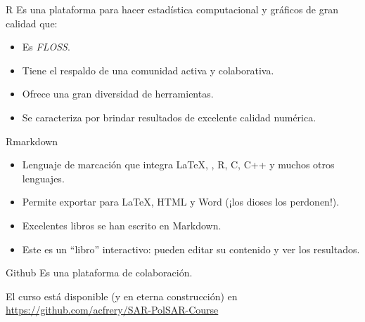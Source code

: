 \documentclass[professionalfonts,table,aspectratio=1610]{beamer}
\begin{document}
\begin{frame}{R}
Es una plataforma para hacer estadística computacional y gráficos de gran calidad que:
\begin{itemize}
\item Es \textit{FLOSS}.
\item Tiene el respaldo de una comunidad activa y colaborativa.
\item Ofrece una gran diversidad de herramientas.
\item Se caracteriza por brindar resultados de excelente calidad numérica.
\end{itemize}
\end{frame}

\begin{frame}{Rmarkdown}

\begin{itemize}
\item Lenguaje de marcación que integra \LaTeX, \BibTeX, R, C, C++ y muchos otros lenguajes.
\item Permite exportar para \LaTeX, HTML y Word (¡los dioses los perdonen!).
\item Excelentes libros se han escrito en Markdown.
\item Este es un ``libro'' interactivo: pueden editar su contenido y ver los resultados.
\end{itemize}
\end{frame}

\begin{frame}{Github}
Es una plataforma de colaboración.

El curso está disponible (y en eterna construcción) en \url{https://github.com/acfrery/SAR-PolSAR-Course}

\end{frame}
\end{document}
